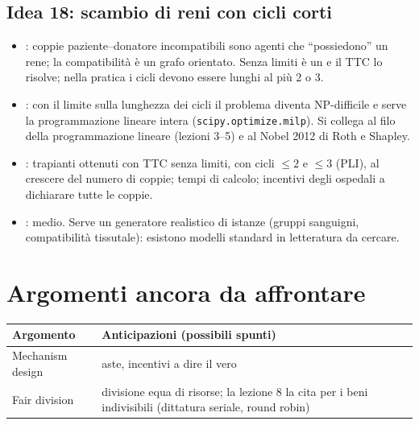 \documentclass[11pt, a4paper, oneside, openany]{book}
\newcommand{\stato}[2]{\etichetta{#1}{#2}}
\newcommand{\sbloccata}[1]{\stato{blu}{DA LEZIONE #1}}
\begin{document}
\subsection*{Idea 18: scambio di reni con cicli corti \hfill\sbloccata{8}}
\begin{itemize}
  \item {}: coppie paziente--donatore incompatibili sono agenti che ``possiedono''
        un rene; la compatibilità è un grafo orientato. Senza limiti è un 
        e il TTC lo risolve; nella pratica i cicli devono essere lunghi al più 2 o 3.
  \item {}: con il limite sulla lunghezza dei cicli il problema
        diventa NP-difficile e serve la programmazione lineare intera
        (\texttt{scipy.optimize.milp}). Si collega al filo della programmazione lineare
        (lezioni 3--5) e al Nobel 2012 di Roth e Shapley.
  \item {}: trapianti ottenuti con TTC senza limiti, con cicli $\le 2$ e
        $\le 3$ (PLI), al crescere del numero di coppie; tempi di calcolo; incentivi degli
        ospedali a dichiarare tutte le coppie.
  \item {}: medio. Serve un generatore realistico di istanze (gruppi sanguigni,
        compatibilità tissutale): esistono modelli standard in letteratura da cercare.
\end{itemize}

\section{Argomenti ancora da affrontare}

\begin{center}
\renewcommand{\arraystretch}{1.25}
\begin{tabularx}{\linewidth}{@{}l X@{}}
\toprule
\textbf{Argomento} & \textbf{Anticipazioni (possibili spunti)} \\
\midrule
Mechanism design               & aste, incentivi a dire il vero \\
Fair division                  & divisione equa di risorse; la lezione 8 la cita per i beni
                                 indivisibili (dittatura seriale, round robin) \\
\bottomrule
\end{tabularx}
\end{center}

\end{document}
